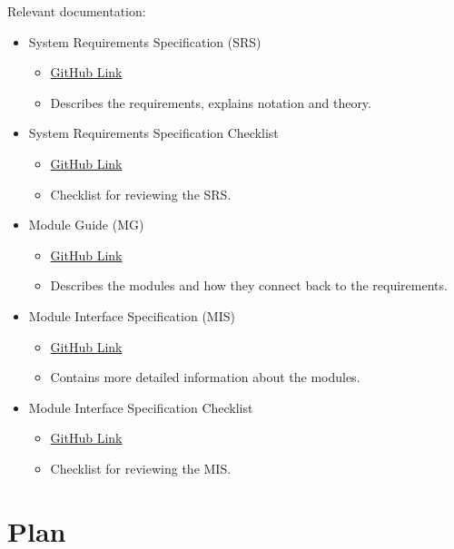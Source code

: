 \documentclass[12pt, titlepage]{article}
\begin{document}
Relevant documentation:
\begin{itemize}
    \item System Requirements Specification (SRS)
    \begin{itemize}
    \item \href{https://github.com/LesleyWheat/CAS741_CEWS/tree/main/docs/SRS}{GitHub Link}
    \item Describes the requirements, explains notation and theory.
    \end{itemize}
    \item System Requirements Specification Checklist
    \begin{itemize}
    \item \href{https://github.com/LesleyWheat/CAS741_CEWS/blob/main/docs/Checklists/SRS-Checklist.pdf}{GitHub Link}
    \item Checklist for reviewing the SRS.
    \end{itemize}
    \item Module Guide (MG)
    \begin{itemize}
    \item \href{https://github.com/LesleyWheat/CAS741_CEWS/blob/main/docs/Design/SoftArchitecture/MG.pdf}{GitHub Link}
    \item Describes the modules and how they connect back to the requirements.
    \end{itemize}
    \item Module Interface Specification (MIS)
    \begin{itemize}
    \item \href{https://github.com/LesleyWheat/CAS741_CEWS/blob/main/docs/Design/SoftDetailedDes/MIS.pdf}{GitHub Link}
    \item Contains more detailed information about the modules.
    \end{itemize}
    \item Module Interface Specification Checklist
    \begin{itemize}
    \item \href{https://github.com/LesleyWheat/CAS741_CEWS/blob/main/docs/Checklists/MIS-Checklist.pdf}{GitHub Link}
    \item Checklist for reviewing the MIS.
    \end{itemize}
\end{itemize}


\section{Plan}
\end{document}
